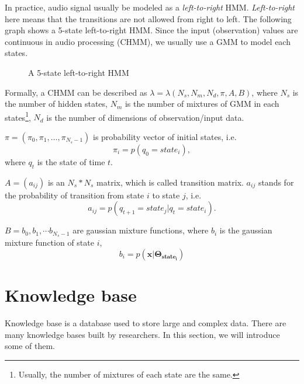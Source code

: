 In practice, audio signal usually be modeled as a {\em left-to-right} HMM. {\em Left-to-right} here means that the transitions are not allowed from right to left. The following graph shows a 5-state left-to-right HMM. Since the input (observation) values are continuous in audio processing (CHMM), we usually use a GMM to model each states.
\begin{figure}[!h]
\centering
{}
\caption{A 5-state left-to-right HMM}
\end{figure}

Formally, a CHMM can be described as $\lambda = \lambda(N_s, N_m, N_d, \pi, A, B)$, where $N_s$ is the number of hidden states, $N_m$ is the number of mixtures of GMM in each states\footnote{Usually, the number of mixtures of each state are the same.}, $N_d$ is the number of dimensions of observation/input data. 

$\pi = (\pi_0, \pi_1, \ldots, \pi_{N_s - 1})$ is probability vector of initial states, i.e.
\begin{equation}
\pi_i = p(q_0=state_i),
\end{equation}
where $q_t$ is the state of time $t$.

$A = (a_{ij})$ is an $N_s * N_s$ matrix, which is called transition matrix. $a_{ij}$ stands for the probability of transition from state $i$ to state $j$, i.e.
\begin{equation}
a_{ij} = p(q_{t + 1} = state_j|q_t = state_i).
\end{equation}

$B = {b_0, b_1,\cdots b_{N_s -1}}$ are gaussian mixture functions, where $b_i$ is the gaussian mixture function of state $i$, \ie
\begin{equation}
b_i = p(\mathbf{x}|\mathbf{\Theta_{state_i}})
\end{equation}
\section{Knowledge base}
Knowledge base is a database used to store large and complex data. There are many knowledge bases built by researchers. In this section, we will introduce some of them.
